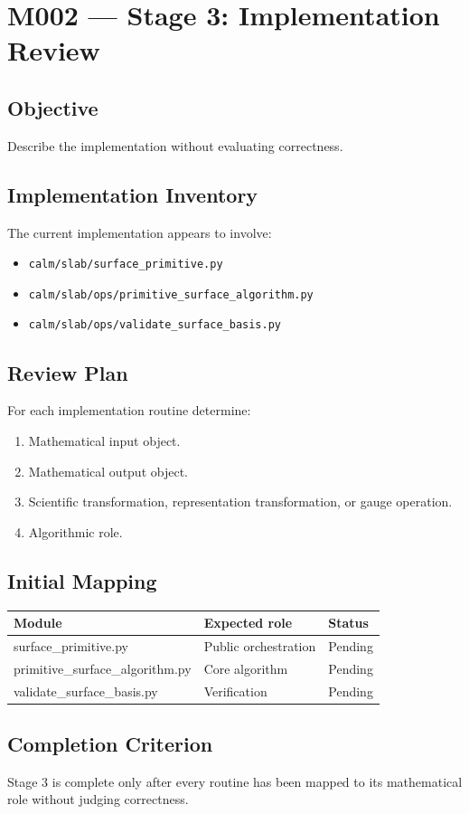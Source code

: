 
\chapter{M002 --- Stage 3: Implementation Review}

\section{Objective}

Describe the implementation without evaluating correctness.

\section{Implementation Inventory}

The current implementation appears to involve:

\begin{itemize}
\item \texttt{calm/slab/surface\_primitive.py}
\item \texttt{calm/slab/ops/primitive\_surface\_algorithm.py}
\item \texttt{calm/slab/ops/validate\_surface\_basis.py}
\end{itemize}

\section{Review Plan}

For each implementation routine determine:

\begin{enumerate}
\item Mathematical input object.
\item Mathematical output object.
\item Scientific transformation, representation transformation,
or gauge operation.
\item Algorithmic role.
\end{enumerate}

\section{Initial Mapping}

\begin{center}
\begin{tabular}{lll}
Module & Expected role & Status\\
\hline
surface\_primitive.py & Public orchestration & Pending\\
primitive\_surface\_algorithm.py & Core algorithm & Pending\\
validate\_surface\_basis.py & Verification & Pending\\
\end{tabular}
\end{center}

\section{Completion Criterion}

Stage 3 is complete only after every routine has been mapped to its
mathematical role without judging correctness.
